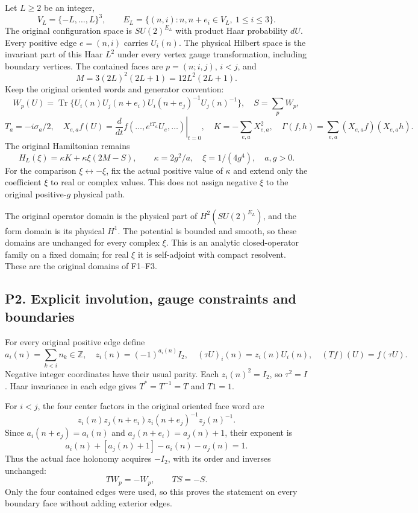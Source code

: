 \documentclass[11pt]{article}
\begin{document}
Let \(L\ge2\) be an integer,
\[
 V_L=\{-L,\ldots,L\}^3,\qquad
 E_L=\{(n,i):n,n+e_i\in V_L,\ 1\le i\le3\}.
\]
The original configuration space is \(SU(2)^{E_L}\) with product Haar probability \(dU\). Every positive edge \(e=(n,i)\) carries \(U_i(n)\). The physical Hilbert space is the invariant part of this Haar \(L^2\) under every vertex gauge transformation, including boundary vertices. The contained faces are \(p=(n;i,j)\), \(i<j\), and
\[
 M=3(2L)^2(2L+1)=12L^2(2L+1).
\]
Keep the original oriented words and generator convention:
\[
 W_p(U)=\operatorname{Tr}\{U_i(n)U_j(n+e_i)
 U_i(n+e_j)^{-1}U_j(n)^{-1}\},\quad S=\sum_pW_p,
\]
\[
 T_a=-i\sigma_a/2,\quad
 X_{e,a}f(U)=\left.\frac{d}{dt}f(\ldots,e^{tT_a}U_e,\ldots)\right|_{t=0},
 \quad K=-\sum_{e,a}X_{e,a}^2,
 \quad\Gamma(f,h)=\sum_{e,a}(X_{e,a}f)(X_{e,a}h).
 \tag{P1}
\]
The original Hamiltonian remains
\[
 H_L(\xi)=\kappa K+\kappa\xi(2M-S),\qquad
 \kappa=2g^2/a,\quad\xi=1/(4g^4),\quad a,g>0. \tag{P2}
\]
For the comparison \(\xi\leftrightarrow-\xi\), fix the actual positive value of \(\kappa\) and extend only the coefficient \(\xi\) to real or complex values. This does not assign negative \(\xi\) to the original positive-\(g\) physical path.

The original operator domain is the physical part of \(H^2(SU(2)^{E_L})\), and the form domain is its physical \(H^1\). The potential is bounded and smooth, so these domains are unchanged for every complex \(\xi\). This is an analytic closed-operator family on a fixed domain; for real \(\xi\) it is self-adjoint with compact resolvent. These are the original domains of F1–F3.

\subsection*{P2. Explicit involution, gauge constraints and boundaries}

For every original positive edge define
\[
 a_i(n)=\sum_{k<i}n_k\in\mathbb Z,\quad
 z_i(n)=(-1)^{a_i(n)}I_2,\quad
 (\tau U)_i(n)=z_i(n)U_i(n),\quad
 (Tf)(U)=f(\tau U). \tag{P3}
\]
Negative integer coordinates have their usual parity. Each \(z_i(n)^2=I_2\), so \(\tau^2=I\). Haar invariance in each edge gives \(T^*=T^{-1}=T\) and \(T1=1\).

For \(i<j\), the four center factors in the original oriented face word are
\[
 z_i(n)z_j(n+e_i)z_i(n+e_j)^{-1}z_j(n)^{-1}.
\]
Since \(a_i(n+e_j)=a_i(n)\) and \(a_j(n+e_i)=a_j(n)+1\), their exponent is
\[
 a_i(n)+[a_j(n)+1]-a_i(n)-a_j(n)=1.
\]
Thus the actual face holonomy acquires \(-I_2\), with its order and inverses unchanged:
\[
 TW_p=-W_p,\qquad TS=-S. \tag{P4}
\]
Only the four contained edges were used, so this proves the statement on every boundary face without adding exterior edges.
\end{document}
